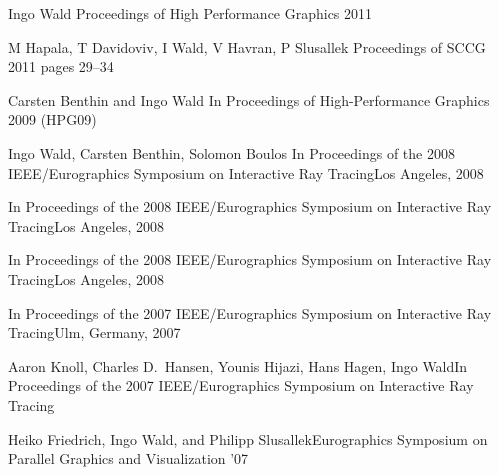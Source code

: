 \documentclass[letterpaper,11pt]{moderncv}
\begin{document}
{Ingo Wald}
{Proceedings of High Performance Graphics 2011}
{}

{M Hapala, T Davidoviv, I Wald, V Havran, P Slusallek}
{Proceedings of SCCG 2011}
{pages 29--34}

 {Carsten Benthin and Ingo Wald}
{In 
Proceedings of High-Performance Graphics 2009 (HPG09)}{}


{
Ingo Wald, Carsten Benthin, Solomon Boulos
} {In Proceedings of the 2008
  IEEE/Eurographics Symposium on Interactive Ray Tracing}{Los Angeles, 2008}

 {In Proceedings of the 2008
  IEEE/Eurographics Symposium on Interactive Ray Tracing}{Los Angeles, 2008}

 {In Proceedings of the 2008
  IEEE/Eurographics Symposium on Interactive Ray Tracing}{Los Angeles, 2008}

 {In Proceedings of the 2007
  IEEE/Eurographics Symposium on Interactive Ray Tracing}{Ulm,
  Germany, 2007}


{Aaron Knoll, Charles D.\ Hansen, Younis Hijazi, Hans Hagen, \und Ingo Wald}{In Proceedings of the 2007 IEEE/Eurographics Symposium on Interactive
    Ray Tracing}{}


{Heiko Friedrich, Ingo Wald, and Philipp Slusallek}{Eurographics Symposium on Parallel Graphics and
    Visualization '07}{}
\end{document}
